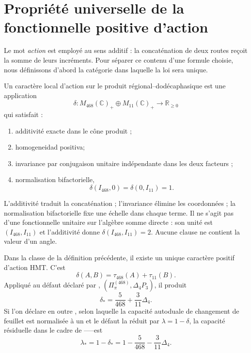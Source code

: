 \section{Propriété universelle de la fonctionnelle positive d’action}

Le mot \emph{action} est employé au sens additif : la concaténation de deux
routes reçoit la somme de leurs incréments. Pour séparer ce contenu d’une
formule choisie, nous définissons d’abord la catégorie dans laquelle la loi sera unique.

\begin{definition}
\label{p3-20260826:def:caracter-accion-hmt}
Un caractère local d’action sur le produit
régional--dodécaphasique est une application
\[
 \delta:
 M_{468}(\mathbb C)_+\oplus M_{11}(\mathbb C)_+
 \longrightarrow\mathbb R_{\ge0}
\]
qui satisfait :
\begin{enumerate}
  \item additivité exacte dans le cône produit ;
  \item homogeneidad positiva;
  \item invariance par conjugaison unitaire indépendante dans les deux
  facteurs ;
  \item normalisation bifactorielle,
  \[
  \delta(I_{468},0)=\delta(0,I_{11})=1.
  \]
\end{enumerate}
\end{definition}

L’additivité traduit la concaténation ; l’invariance élimine les
coordonnées ; la normalisation bifactorielle fixe une échelle dans chaque terme.
Il ne s’agit pas d’une fonctionnelle unitaire sur l’algèbre somme directe : son unité
est \((I_{468},I_{11})\) et l’additivité donne
\(\delta(I_{468},I_{11})=2\). Aucune clause ne contient la valeur d’un
angle.

\begin{theorem}
\label{p3-20260826:thm:ley-accion-hmt}
Dans la classe de la définition précédente, il existe un unique caractère positif
d’action HMT\@. C’est
\[
 \boxed{\delta(A,B)=\tau_{468}(A)+\tau_{11}(B).}
\]
Appliqué au défaut déclaré par \HDef,
\((\Pi_\pi^{(468)},\Delta_4P_3)\), il produit
\[
 \delta_*=\frac5{468}+\frac3{11}\Delta_4.
\]
Si l’on déclare en outre \HRes, selon laquelle la capacité autoduale de changement de
feuillet est normalisée à un et le défaut la réduit par
\(\lambda=1-\delta\), la capacité résiduelle dans le cadre de \HTr--\HAdd--\HDef--\HRes est
\[
 \boxed{
 \lambda_*
 =1-\delta_*
 =1-\frac5{468}-\frac3{11}\Delta_4.
 }
\]
\end{theorem}

